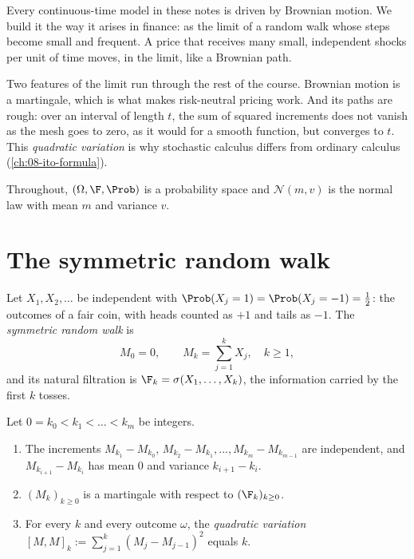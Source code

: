 
Every continuous-time model in these notes is driven by Brownian motion. We build it
the way it arises in finance: as the limit of a random walk whose steps become small and
frequent. A price that receives many small, independent shocks per unit of time moves,
in the limit, like a Brownian path.

Two features of the limit run through the rest of the course. Brownian motion is a
martingale, which is what makes risk-neutral pricing work. And its paths are rough:
over an interval of length $t$, the sum of squared increments does not vanish as the
mesh goes to zero, as it would for a smooth function, but converges to $t$. This
\emph{quadratic variation} is why stochastic calculus differs from ordinary calculus
(\cref{ch:08-ito-formula}).

Throughout, $(\Omega,\F,\Prob)$ is a probability space and $\mathcal N(m,v)$ is the
normal law with mean $m$ and variance $v$.

\section{The symmetric random walk}\label{sec:bm-rw}

Let $X_1,X_2,\dots$ be independent with $\Prob(X_j=1)=\Prob(X_j=-1)=\tfrac12$: the
outcomes of a fair coin, with heads counted as $+1$ and tails as $-1$. The
\emph{symmetric random walk} is
\[
  M_0 = 0,\qquad M_k = \sum_{j=1}^{k} X_j,\quad k\ge 1,
\]
and its natural filtration is $\F_k=\sigma(X_1,\dots,X_k)$, the information carried by
the first $k$ tosses.

\begin{proposition}\label{prop:bm-rw}
Let $0=k_0<k_1<\dots<k_m$ be integers.
\begin{enumerate}[label=(\roman*)]
  \item The increments $M_{k_1}-M_{k_0},\,M_{k_2}-M_{k_1},\dots,M_{k_m}-M_{k_{m-1}}$ are
    independent, and $M_{k_{i+1}}-M_{k_i}$ has mean $0$ and variance $k_{i+1}-k_i$.
  \item $(M_k)_{k\ge0}$ is a martingale with respect to $(\F_k)_{k\ge0}$.
  \item For every $k$ and every outcome $\omega$, the \emph{quadratic variation}
    $[M,M]_k := \sum_{j=1}^{k}(M_j-M_{j-1})^2$ equals $k$.
\end{enumerate}
\end{proposition}

